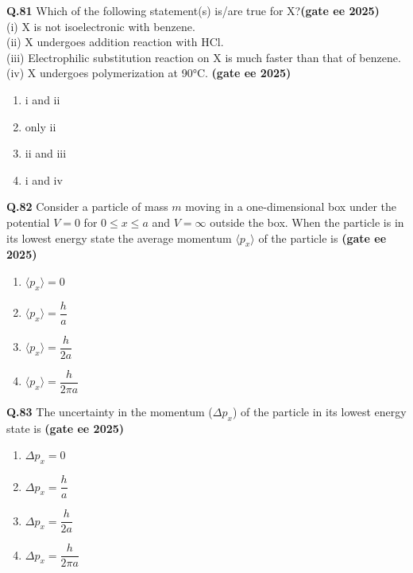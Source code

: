 \documentclass[journal,12pt,onecolumn]{exam}
\theoremstyle{remark}
\begin{document}
\noindent \textbf{Q.81} Which of the following statement(s) is/are true for X?\hfill{\textbf{(gate ee 2025)}}\\
(i) X is not isoelectronic with benzene.\\
(ii) X undergoes addition reaction with HCl.\\
(iii) Electrophilic substitution reaction on X is much faster than that of benzene.\\
(iv) X undergoes polymerization at 90°C. \hfill{\textbf{(gate ee 2025)}}
\begin{multicols}{2}
\begin{enumerate}[label=(\Alph*)]
    \item i and ii
    \item only ii
    \item ii and iii
    \item i and iv
\end{enumerate}
\end{multicols}
\vspace{0.5cm}

\noindent \textbf{Q.82} Consider a particle of mass $m$ moving in a one-dimensional box under the potential $V=0$ for $0 \le x \le a$ and $V = \infty$ outside the box. When the particle is in its lowest energy state the average momentum $\langle p_x \rangle$ of the particle is \hfill{\textbf{(gate ee 2025)}}
\begin{multicols}{2}
\begin{enumerate}[label=(\Alph*)]
    \item $\langle p_x \rangle = 0$
    \item $\langle p_x \rangle = \dfrac{h}{a}$
    \item $\langle p_x \rangle = \dfrac{h}{2a}$
    \item $\langle p_x \rangle = \dfrac{h}{2\pi a}$
\end{enumerate}
\end{multicols}
\vspace{0.5cm}

\noindent \textbf{Q.83} The uncertainty in the momentum ($\Delta p_x$) of the particle in its lowest energy state is \hfill{\textbf{(gate ee 2025)}}
\begin{multicols}{2}
\begin{enumerate}[label=(\Alph*)]
    \item $\Delta p_x = 0$
    \item $\Delta p_x = \dfrac{h}{a}$
    \item $\Delta p_x = \dfrac{h}{2a}$
    \item $\Delta p_x = \dfrac{h}{2\pi a}$
\end{enumerate}
\end{multicols}
\vspace{0.5cm}
\end{document}
